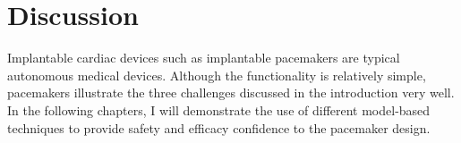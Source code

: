\section{Discussion}
Implantable cardiac devices such as implantable pacemakers are typical autonomous medical devices.
Although the functionality is relatively simple, pacemakers illustrate the three challenges discussed in the introduction very well.
In the following chapters, I will demonstrate the use of different model-based techniques to provide safety and efficacy confidence to the pacemaker design.


